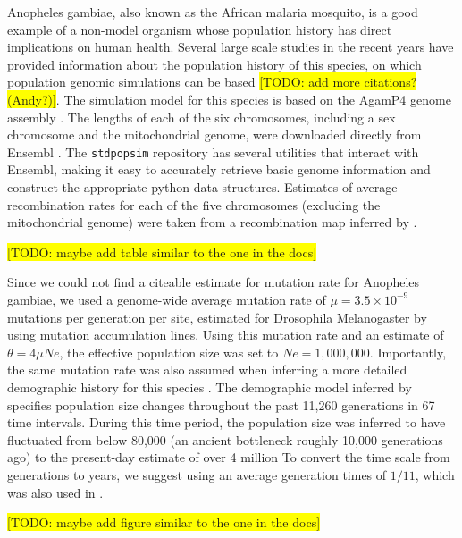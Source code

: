\documentclass[hidelinks]{article}
\newcommand{\stdpopsim}{\texttt{stdpopsim}\xspace}
\begin{document}
Anopheles gambiae, also known as the African malaria mosquito, is a good example of a non-model organism whose population history has direct implications on human health. Several large scale studies in the recent years have provided information about the population history of this species, on which population genomic simulations can be based \citep{Pombi2006,Miles2017} \colorbox{yellow}{[TODO: add more citations? (Andy?)]}. The simulation model for this species is based on the AgamP4 genome assembly \citep{Sharakhova2007}. The lengths of each of the six chromosomes, including a sex chromosome and the mitochondrial genome, were downloaded directly from Ensembl \citep{ensembl2021}.
The \texttt{\stdpopsim} repository has several utilities that interact with Ensembl, making it easy to accurately retrieve basic genome information and construct the appropriate python data structures.
%
%
Estimates of average recombination rates for each of the five chromosomes (excluding the mitochondrial genome) were taken from a recombination map inferred by \cite{Pombi2006}.
%

\colorbox{yellow}{[TODO:  maybe add table similar to the one in the docs]} 

Since we could not find a citeable estimate for mutation rate for Anopheles gambiae, we used a genome-wide average mutation rate of $\mu=3.5 \times 10^{-9}$ mutations per generation per site, estimated for Drosophila Melanogaster by \cite{Keightley2009} using mutation accumulation lines. Using this mutation rate and an estimate of $\theta=4\mu Ne$, the effective population size was set to $Ne=1,000,000$.
%
Importantly, the same mutation rate was also assumed when inferring a more detailed demographic history for this species \citep{Miles2017}. The demographic model inferred by \cite{Miles2017} specifies population size changes throughout the past 11,260 generations in 67 time intervals. During this time period, the population size was inferred to have fluctuated from below 80,000 (an ancient bottleneck roughly 10,000 generations ago) to the present-day estimate of over 4 million %
To convert the time scale from generations to years, we suggest using an average generation times of $1/11$, which was also used in \citep{Miles2017}.

\colorbox{yellow}{[TODO:  maybe add figure similar to the one in the docs]} 
\end{document}
